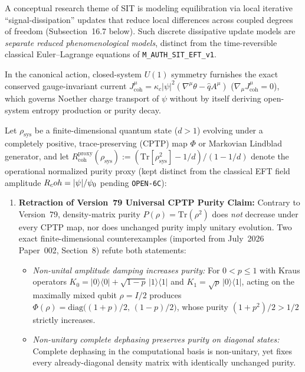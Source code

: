 A conceptual research theme of SIT is modeling equilibration via local iterative ``signal-dissipation'' updates that reduce local differences across coupled degrees of freedom (Subsection~16.7 below). Such discrete dissipative update models are \emph{separate reduced phenomenological models}, distinct from the time-reversible classical Euler--Lagrange equations of \texttt{M\_AUTH\_SIT\_EFT\_v1}.

In the canonical action, closed-system $U(1)$ symmetry furnishes the exact conserved gauge-invariant current $J^\mu_{\mathrm{coh}} = \kappa_c |\psi|^2 (\nabla^\mu\theta - \hat{q}A^\mu)$ ($\nabla_\mu J^\mu_{\mathrm{coh}} = 0$), which governs Noether charge transport of $\psi$ without by itself deriving open-system entropy production or purity decay.

\begin{result}
\label{thm:CoherenceMonotonicity}
Let $\rho_{\mathrm{sys}}$ be a finite-dimensional quantum state ($d > 1$) evolving under a completely positive, trace-preserving (CPTP) map $\Phi$ or Markovian Lindblad generator, and let $R_{\mathrm{coh}}^{\mathrm{proxy}}(\rho_{\mathrm{sys}}) := (\mathrm{Tr}[\rho_{\mathrm{sys}}^2] - 1/d)/(1 - 1/d)$ denote the operational normalized purity proxy (kept distinct from the classical EFT field amplitude $R_coh = |\psi|/\psi_0$ pending \texttt{OPEN-6C}):
\begin{enumerate}[leftmargin=2em]
  \item \textbf{Retraction of Version~79 Universal CPTP Purity Claim:} Contrary to Version~79, density-matrix purity $P(\rho) = \mathrm{Tr}(\rho^2)$ does \emph{not} decrease under every CPTP map, nor does unchanged purity imply unitary evolution. Two exact finite-dimensional counterexamples (imported from July~2026 Paper~002, Section~8) refute both statements:
  \begin{itemize}
    \item \emph{Non-unital amplitude damping increases purity:} For $0 < p \le 1$ with Kraus operators $K_0 = |0\rangle\langle 0| + \sqrt{1-p}\,|1\rangle\langle 1|$ and $K_1 = \sqrt{p}\,|0\rangle\langle 1|$, acting on the maximally mixed qubit $\rho = I/2$ produces $\Phi(\rho) = \mathrm{diag}\bigl((1+p)/2,\,(1-p)/2\bigr)$, whose purity $(1+p^2)/2 > 1/2$ strictly increases.
    \item \emph{Non-unitary complete dephasing preserves purity on diagonal states:} Complete dephasing in the computational basis is non-unitary, yet fixes every already-diagonal density matrix with identically unchanged purity.

\end{itemize}
\end{enumerate}
\end{result}
